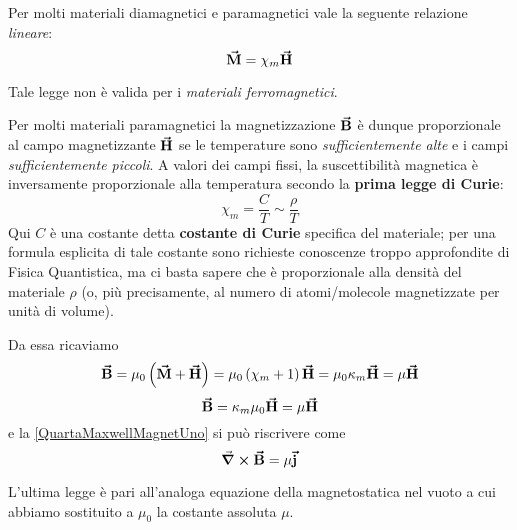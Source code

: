 Per molti materiali diamagnetici e paramagnetici vale la seguente relazione \textit{lineare}:
\begin{equation}
	\vb*{\va{M}}=\chi_m\vb*{\va{H}}
\end{equation}
\begin{attention}
	Tale legge non è valida per i \textit{materiali ferromagnetici}.
\end{attention}
\begin{digression}
	Per molti materiali paramagnetici la magnetizzazione $\vb*{\va{B}}$ è dunque proporzionale al campo magnetizzante $\vb*{\va{H}}$ se le temperature sono \textit{sufficientemente alte} e i campi \textit{sufficientemente piccoli}. A valori dei campi fissi, la suscettibilità magnetica è inversamente proporzionale alla temperatura secondo la \textbf{prima legge di Curie}:
	\begin{equation*}
		\chi_m=\frac{C}{T}\sim\frac{\rho}{T}
	\end{equation*}
	Qui $C$ è una costante detta \textbf{costante di Curie} specifica del materiale; per una formula esplicita di tale costante sono richieste conoscenze troppo approfondite di Fisica Quantistica, ma ci basta sapere che è proporzionale alla densità del materiale $\rho$ (o, più precisamente, al numero di atomi/molecole magnetizzate per unità di volume).
\end{digression}
\noindent Da essa ricaviamo
\begin{equation*}
	\vb*{\va{B}}=\mu_0\left(\vb*{\va{M}}+\vb*{\va{H}}\right)=\mu_0\left(\chi_m+1\right)\vb*{\va{H}}=\mu_0\kappa_m\vb*{\va{H}}=\mu\vb*{\va{H}}
\end{equation*}
\begin{equation}
	\vb*{\va{B}}=\kappa_m\mu_0\vb*{\va{H}}=\mu\vb*{\va{H}}
\end{equation}
e la \eqref{QuartaMaxwellMagnetUno} si può riscrivere come
\begin{equation}
	\curl{\vb*{\va{B}}}=\mu\vb*{\va{j}}
\end{equation}
\begin{observe}
	L'ultima legge è pari all'analoga equazione della magnetostatica nel vuoto a cui abbiamo sostituito a $\mu_0$ la costante assoluta $\mu$.
\end{observe}
